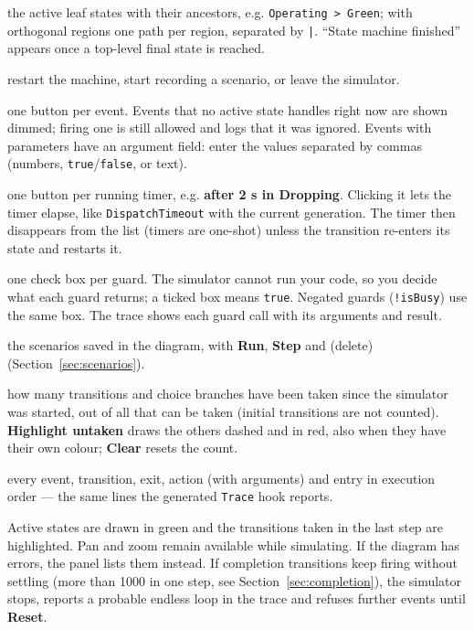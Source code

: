 \documentclass[11pt,a4paper,openany]{report}
\newcommand{\ui}[1]{\textsf{\textbf{#1}}}
\newcommand{\code}[1]{\texttt{#1}}
\begin{document}
\begin{description}[style=nextline, itemsep=2pt]
  \item[Active] the active leaf states with their ancestors, e.g. \code{Operating > Green}; with
    orthogonal regions one path per region, separated by \code{|}. ``State machine finished'' appears
    once a top-level final state is reached.
  \item[Reset / Record / Stop] restart the machine, start recording a scenario, or leave the simulator.
  \item[Events] one button per event. Events that no active state handles right now are shown dimmed;
    firing one is still allowed and logs that it was ignored. Events with parameters have an argument
    field: enter the values separated by commas (numbers, \code{true}/\code{false}, or text).
  \item[Running timers] one button per running timer, e.g. \ui{after 2 s in Dropping}. Clicking it lets
    the timer elapse, like \code{DispatchTimeout} with the current generation. The timer then
    disappears from the list (timers are one-shot) unless the transition re-enters its state and
    restarts it.
  \item[Guard results] one check box per guard. The simulator cannot run your code, so you decide what
    each guard returns; a ticked box means \code{true}. Negated guards (\code{!isBusy}) use the same box.
    The trace shows each guard call with its arguments and result.
  \item[Scenarios] the scenarios saved in the diagram, with \ui{Run}, \ui{Step} and \ui{\texttimes}
    (delete) (Section~\ref{sec:scenarios}).
  \item[Coverage] how many transitions and choice branches have been taken since the simulator was
    started, out of all that can be taken (initial transitions are not counted). \ui{Highlight untaken}
    draws the others dashed and in red, also when they have their own colour; \ui{Clear} resets the
    count.
  \item[Trace] every event, transition, exit, action (with arguments) and entry in execution order ---
    the same lines the generated \code{Trace} hook reports.
\end{description}

Active states are drawn in green and the transitions taken in the last step are highlighted. Pan and
zoom remain available while simulating. If the diagram has errors, the panel lists them instead.
If completion transitions keep firing without settling (more than 1000 in one step, see
Section~\ref{sec:completion}), the simulator stops, reports a probable endless loop in the trace and
refuses further events until \ui{Reset}.
\end{document}
